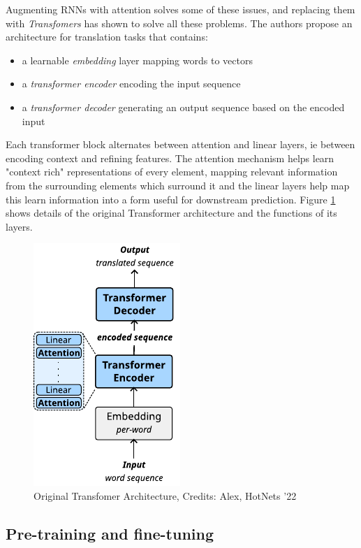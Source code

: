 Augmenting RNNs with attention solves some of these issues\cite{rnnattention},  and replacing them with \emph{Transfomers} has shown to solve all these problems.
The authors propose an architecture for translation tasks that contains:
\begin{itemize}
\item a learnable \emph{embedding} layer mapping words to vectors
\item a \emph{transformer encoder} encoding the input sequence
\item a \emph{transformer decoder} generating an output sequence based on the encoded input
\end{itemize}

Each transformer block alternates between attention and linear layers, ie between encoding context and refining features. The attention mechanism helps learn "context rich" representations of every element, mapping relevant information from the surrounding elements which surround it and the linear layers help map this learn information into a form useful for downstream prediction. Figure \ref{fig:transformer} shows details of the original Transformer architecture and the functions of its layers.

\begin{figure}[!hbt]
  \begin{center}
    \includegraphics[scale=1.5]{figures/architecture_transformer.pdf}
    \caption{Original Transfomer Architecture, Credits: Alex, HotNets '22}
    \label{fig:transformer}
  \end{center}
\end{figure}

\subsection{Pre-training and fine-tuning}

